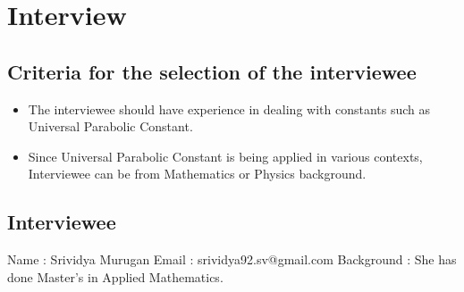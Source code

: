 \documentclass{report}
\begin{document}
\newpage


\chapter{Interview}
\section{Criteria for the selection of the interviewee }
\newline

\begin{itemize}
  \item The interviewee should have experience in dealing with constants such as Universal Parabolic Constant.
  \item Since Universal Parabolic Constant is being applied in various contexts, Interviewee can be from Mathematics or Physics background.
\end{itemize}



\section{Interviewee}
\newline Name    : Srividya Murugan
\newline Email : srividya92.sv@gmail.com
\newline Background : She has done Master's in Applied Mathematics.

\newenvironment{qanda}{\setlength{\parindent}{0pt}}{\bigskip}
\newcommand{\Q}{\bigskip\bfseries Q: }
\newcommand{\A}{\par\textbf{A:} \normalfont}
 
\end{document}
